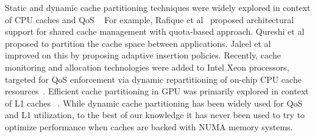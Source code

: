 Static and dynamic cache partitioning techniques were widely explored in
context of CPU caches and QoS
~\cite{ics2007,Herdrich2016CacheQF,pact06,qureshi-micro,jaleel-pact} For
example, Rafique et al~\cite{pact06} proposed architectural support for shared
cache management with quota-based approach. Qureshi et al~\cite{qureshi-micro}
proposed to partition the cache space between applications. Jaleel et
al~\cite{jaleel-pact} improved on this by proposing adaptive insertion
policies. Recently, cache monitoring and allocation technologies were added to
Intel Xeon processors, targeted for QoS enforcement via dynamic repartitioning
of on-chip CPU cache resources~\cite{Herdrich2016CacheQF}.  Efficient cache
partitioning in GPU was primarily explored in context of L1 caches
~\cite{li-priority-based}. While dynamic cache partitioning has been widely used for
QoS and L1 utilization, to the best of our knowledge it has never been used
to try to optimize performance when caches are backed with NUMA memory
systems.